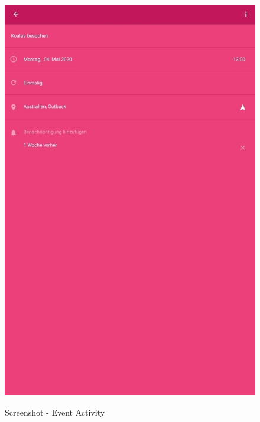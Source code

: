 \begin{figure}[H]
\centering
\begin{minipage}[t]{1\textwidth} %
\caption{Screenshot - Event Activity} %
\includegraphics[width=13 cm]{img/Screenshot_EventActivity.jpg}\\ %
\end{minipage}
\end{figure}

